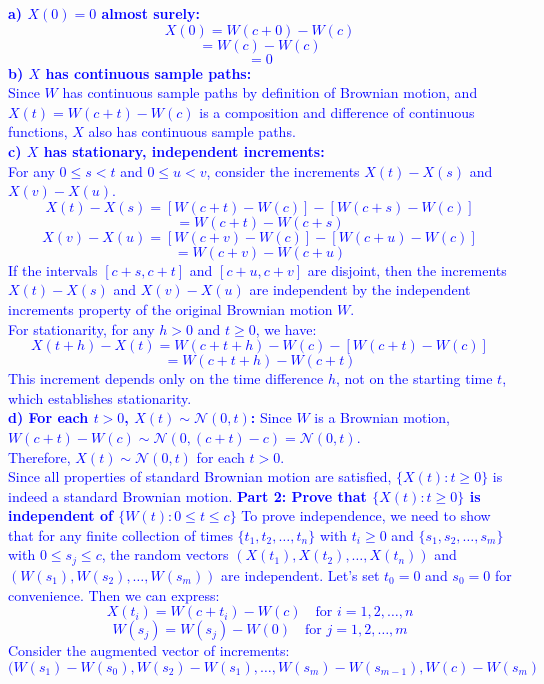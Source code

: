 \documentclass{article}
\begin{document}
\textcolor{blue}{
\noindent \textbf{a) $X(0) = 0$ almost surely:} 
$$X(0)= W(c + 0) - W(c)$$
$$= W(c) - W(c)$$ 
$$= 0$$
\noindent \textbf{b) $X$ has continuous sample paths:} \\
Since $W$ has continuous sample paths by definition of Brownian motion, and $X(t) = W(c + t) - W(c)$ is a composition and difference of continuous functions, $X$ also has continuous sample paths. \\
\noindent \textbf{c) $X$ has stationary, independent increments:} \\
For any $0 \leq s < t$ and $0 \leq u < v$, consider the increments $X(t) - X(s)$ and $X(v) - X(u)$. \\
$$X(t) - X(s) = [W(c + t) - W(c)] - [W(c + s) - W(c)] $$
$$= W(c + t) - W(c + s)$$
$$X(v) - X(u) = [W(c + v) - W(c)] - [W(c + u) - W(c)] $$
$$= W(c + v) - W(c + u)$$
If the intervals $[c+s, c+t]$ and $[c+u, c+v]$ are disjoint, then the increments $X(t) - X(s)$ and $X(v) - X(u)$ are independent by the independent increments property of the original Brownian motion $W$. \\
For stationarity, for any $h > 0$ and $t \geq 0$, we have:
$$X(t+h) - X(t) = W(c + t + h) - W(c) - [W(c + t) - W(c)]$$
$$= W(c + t + h) - W(c + t)$$
This increment depends only on the time difference $h$, not on the starting time $t$, which establishes stationarity. \\
\noindent \textbf{d) For each $t > 0$, $X(t) \sim \mathcal{N}(0, t)$:}
Since $W$ is a Brownian motion, $W(c + t) - W(c) \sim \mathcal{N}(0, (c+t) - c) = \mathcal{N}(0, t)$.  \\
Therefore, $X(t) \sim \mathcal{N}(0, t)$ for each $t > 0$. \\
Since all properties of standard Brownian motion are satisfied, $\{X(t) : t \geq 0\}$ is indeed a standard Brownian motion.
\medskip
\noindent \textbf{Part 2: Prove that $\{X(t) : t \geq 0\}$ is independent of $\{W(t) : 0 \leq t \leq c\}$}
To prove independence, we need to show that for any finite collection of times $\{t_1, t_2, \ldots, t_n\}$ with $t_i \geq 0$ and $\{s_1, s_2, \ldots, s_m\}$ with $0 \leq s_j \leq c$, the random vectors $(X(t_1), X(t_2), \ldots, X(t_n))$ and $(W(s_1), W(s_2), \ldots, W(s_m))$ are independent.
Let's set $t_0 = 0$ and $s_0 = 0$ for convenience. Then we can express:
$$X(t_i) = W(c + t_i) - W(c) \quad \text{for } i = 1, 2, \ldots, n$$
$$W(s_j) = W(s_j) - W(0) \quad \text{for } j = 1, 2, \ldots, m$$
Consider the augmented vector of increments:
$$(W(s_1) - W(s_0), W(s_2) - W(s_1), \ldots, W(s_m) - W(s_{m-1}), W(c) - W(s_m)$$
}
\end{document}
